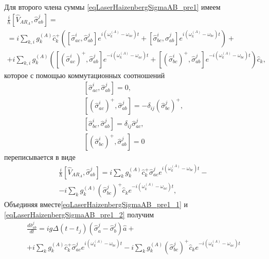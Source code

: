 Для второго члена суммы \eqref{eqLaserHaizenbergSigmaAB_pre1} имеем
\begin{eqnarray}
\frac{i}{\hbar}
\left[\hat{V}_{AR_A}, \hat{\sigma}_{ab}^j\right] = 
\nonumber \\
=
i
\sum_{k,i}
g_k^{(A)}
\hat{c}_k^{+}
 \left(
\left[\hat{\sigma}^{i}_{ac},\hat{\sigma}_{ab}^j\right]  
e^{i\left(\omega_k^{(A)} - \omega_{ac}\right)t}
+ 
\left[\hat{\sigma}^{i}_{bc},\hat{\sigma}_{ab}^j\right]  
e^{i\left(\omega_k^{(A)} - \omega_{bc}\right)t}
\right)
+
\nonumber \\
+
 i
\sum_{k,i}
g_k^{(A)}
 \left(
\left[\left(\hat{\sigma}^{i}_{ac}\right)^{+},\hat{\sigma}_{ab}^j\right]  
e^{-i\left(\omega_k^{(A)} - \omega_{ac}\right)t}
+ 
\left[\left(\hat{\sigma}^{i}_{bc}\right)^{+},\hat{\sigma}_{ab}^j\right]  
e^{-i\left(\omega_k^{(A)} - \omega_{bc}\right)t}
\right)\hat{c}_k,
\nonumber
\end{eqnarray}
которое с помощью коммутационных соотношений
\begin{eqnarray}
\left[\hat{\sigma}^{i}_{ac},\hat{\sigma}_{ab}^j\right] = 0, 
\nonumber \\
\left[\left(\hat{\sigma}^{i}_{ac}\right)^{+},\hat{\sigma}_{ab}^j\right] = 
- \delta_{ij}\left(\hat{\sigma}^{j}_{bc}\right)^{+},
\nonumber \\
\left[\hat{\sigma}^{i}_{bc},\hat{\sigma}_{ab}^j\right] = \delta_{ij}\hat{\sigma}^{j}_{ac},
\nonumber \\
\left[\left(\hat{\sigma}^{i}_{bc}\right)^{+},\hat{\sigma}_{ab}^j\right] = 0
\label{eqLaserHaizenbergTaskKommutator2}
\end{eqnarray}
переписывается в виде
\begin{eqnarray}
\frac{i}{\hbar}
\left[\hat{V}_{AR_A}, \hat{\sigma}_{ab}^j\right] = 
i
\sum_{k}
g_k^{(A)}
\hat{c}_k^{+}
\hat{\sigma}^{j}_{ac}  
e^{i\left(\omega_k^{(A)} - \omega_{bc}\right)t} -
\nonumber \\
-
 i
\sum_{k}
g_k^{(A)}
\left(\hat{\sigma}^{j}_{bc}\right)^{+}\hat{c}_k
e^{-i\left(\omega_k^{(A)} - \omega_{ac}\right)t},
\label{eqLaserHaizenbergSigmaAB_pre1_2}
\end{eqnarray}
Объединяя вместе\eqref{eqLaserHaizenbergSigmaAB_pre1_1} и 
\eqref{eqLaserHaizenbergSigmaAB_pre1_2} получим 
\begin{eqnarray}
\frac{d \hat{\sigma}_{ab}^j}{d t} = 
i g 
\Delta\left(t - t_j\right) 
\left(\hat{\sigma}^{j}_{a} -
\hat{\sigma}^{j}_{b}\right)\hat{a} +
\nonumber \\
+ i \sum_{k}
g_k^{(A)}
\hat{c}_k^{+}
\hat{\sigma}^{j}_{ac}  
e^{i\left(\omega_k^{(A)} - \omega_{bc}\right)t}
-
 i
\sum_{k}
g_k^{(A)}
\left(\hat{\sigma}^{j}_{bc}\right)^{+}\hat{c}_k
e^{-i\left(\omega_k^{(A)} - \omega_{ac}\right)t}
\label{eqLaserHaizenbergSigmaAB_pre2}
\end{eqnarray}
